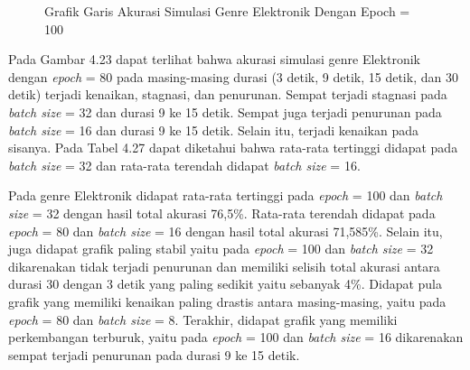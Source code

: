 \begin{enumerate}
\begin{figure}[H]
			\caption{Grafik Garis Akurasi Simulasi Genre Elektronik Dengan Epoch = 100}
			\label{fig:elecsumcharte100}
		\end{figure}
		
		Pada Gambar 4.23 dapat terlihat bahwa akurasi simulasi genre Elektronik dengan \emph{epoch} = 80 pada masing-masing durasi (3 detik, 9 detik, 15 detik, dan 30 detik) terjadi kenaikan, stagnasi, dan penurunan. Sempat terjadi stagnasi pada \emph{batch size} = 32 dan durasi 9 ke 15 detik. Sempat juga terjadi penurunan pada \emph{batch size} = 16 dan durasi 9 ke 15 detik. Selain itu, terjadi kenaikan pada sisanya. Pada Tabel 4.27 dapat diketahui bahwa rata-rata tertinggi didapat pada \emph{batch size} = 32 dan rata-rata terendah didapat \emph{batch size} = 16.
		
		Pada genre Elektronik didapat rata-rata tertinggi pada \emph{epoch} = 100 dan \emph{batch size} = 32 dengan hasil total akurasi 76,5\%. Rata-rata terendah didapat pada \emph{epoch} = 80 dan \emph{batch size} = 16 dengan hasil total akurasi 71,585\%. Selain itu, juga didapat grafik paling stabil yaitu pada \emph{epoch} = 100 dan \emph{batch size} = 32 dikarenakan tidak terjadi penurunan dan memiliki selisih total akurasi antara durasi 30 dengan 3 detik yang paling sedikit yaitu sebanyak 4\%. Didapat pula grafik yang memiliki kenaikan paling drastis antara masing-masing, yaitu pada \emph{epoch} = 80 dan \emph{batch size} = 8. Terakhir, didapat grafik yang memiliki perkembangan terburuk, yaitu pada \emph{epoch} = 100 dan \emph{batch size} = 16 dikarenakan sempat terjadi penurunan pada durasi 9 ke 15 detik.
		

\end{enumerate}
